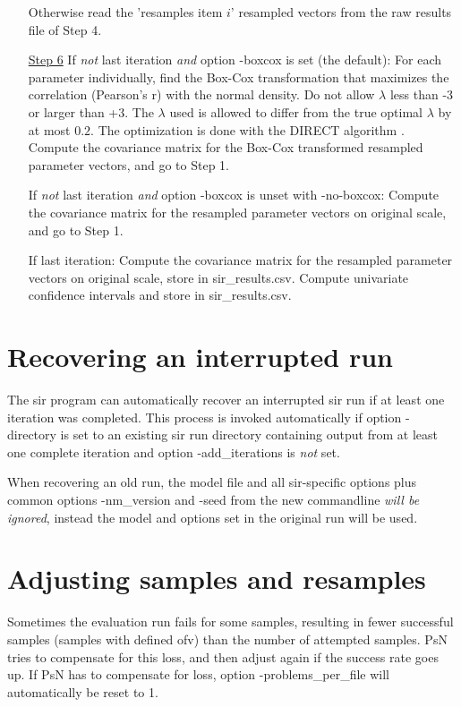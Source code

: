 \begin{itemize}
\noindent Otherwise read the 'resamples item $i$' resampled vectors from the raw results file of Step 4.
\item[\underline{Step 6}]
If \emph{not} last iteration \emph{and} option -boxcox is set (the default): 
For each parameter individually, find the Box-Cox transformation that maximizes the correlation (Pearson's r) with the normal density.
Do not allow $\lambda$ less than -3 or larger than +3. The  $\lambda$ used is allowed to differ from the true optimal  $\lambda$
by at most $0.2$. The optimization is done with the DIRECT algorithm \cite{direct}.
Compute the covariance matrix for the Box-Cox transformed resampled parameter vectors, and go to Step 1.

\noindent If \emph{not} last iteration \emph{and} option -boxcox is unset with -no-boxcox: 
Compute the covariance matrix for the resampled parameter vectors on original scale, and go to Step 1.

\noindent If last iteration: 
Compute the covariance matrix for the resampled parameter vectors on original scale, 
store in sir\_results.csv. 
Compute univariate confidence intervals and store in sir\_results.csv.
\end{itemize}

\section{Recovering an interrupted run}
The sir program can automatically recover an interrupted sir run
if at least one iteration was completed. This process is invoked automatically
if option -directory is set to an existing sir run directory containing output from
at least one complete iteration and option -add\_iterations is \emph{not} set.

When recovering an old run, the model file and all sir-specific options plus common options 
-nm\_version and -seed from
the new commandline \emph{will be ignored}, instead the model and options
set in the original run will be used.

\section{Adjusting samples and resamples}
Sometimes the evaluation run fails for some samples, resulting in fewer successful samples (samples with defined ofv)
than the number of attempted samples. PsN tries to compensate for this loss, and then
adjust again if the success rate goes up. If PsN has to compensate for loss, option -problems\_per\_file will 
automatically be reset to 1.
